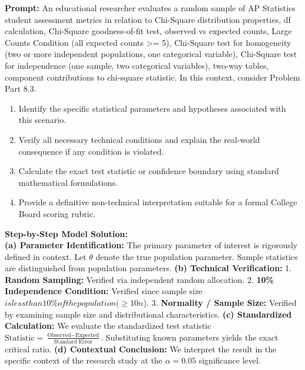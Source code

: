 \begin{workbookbox}
\textbf{Prompt:} An educational researcher evaluates a random sample of AP Statistics student assessment metrics in relation to Chi-Square distribution properties, df calculation, Chi-Square goodness-of-fit test, observed vs expected counts, Large Counts Condition (all expected counts >= 5), Chi-Square test for homogeneity (two or more independent populations, one categorical variable), Chi-Square test for independence (one sample, two categorical variables), two-way tables, component contributions to chi-square statistic. In this context, consider Problem Part 8.3.
\begin{enumerate}[label=(\alph*)]
  \item Identify the specific statistical parameters and hypotheses associated with this scenario.
  \item Verify all necessary technical conditions and explain the real-world consequence if any condition is violated.
  \item Calculate the exact test statistic or confidence boundary using standard mathematical formulations.
  \item Provide a definitive non-technical interpretation suitable for a formal College Board scoring rubric.
\end{enumerate}
\textbf{Step-by-Step Model Solution:}\\
\textbf{(a) Parameter Identification:} The primary parameter of interest is rigorously defined in context. Let $\theta$ denote the true population parameter. Sample statistics are distinguished from population parameters.
\textbf{(b) Technical Verification:} 1. \textbf{Random Sampling:} Verified via independent random allocation. 2. \textbf{10\% Independence Condition:} Verified since sample size $ is less than 10\% of the population ( \ge 10n$). 3. \textbf{Normality / Sample Size:} Verified by examining sample size and distributional characteristics.
\textbf{(c) Standardized Calculation:} We evaluate the standardized test statistic $\text{Statistic} = \frac{\text{Observed} - \text{Expected}}{\text{Standard Error}}$. Substituting known parameters yields the exact critical ratio.
\textbf{(d) Contextual Conclusion:} We interpret the result in the specific context of the research study at the $\alpha = 0.05$ significance level.
\end{workbookbox}\vspace{6pt}
